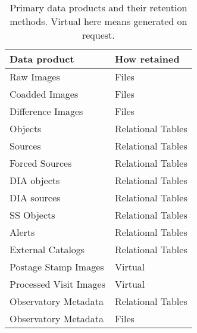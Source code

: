 
\begin{center}
\begin{table}
\caption{Primary data products and their retention methods. Virtual here means generated on request. \label{tab:prods}}
\begin{tabular}{|l|l|}\hline
{\bf Data product}&{\bf  How retained}\\\hline
Raw Images  & Files \\\hline
Coadded Images & Files \\\hline
Difference Images  & Files \\\hline
Objects & Relational Tables \\\hline
Sources  & Relational Tables \\\hline
Forced Sources & Relational Tables \\\hline
DIA objects & Relational Tables \\\hline
DIA sources  & Relational Tables \\\hline
SS Objects  & Relational Tables \\\hline
Alerts & Relational Tables \\\hline
External Catalogs & Relational Tables \\\hline
Postage Stamp Images & Virtual \\\hline
Processed Visit Images & Virtual \\\hline
Observatory Metadata  & Relational Tables \\\hline
Observatory Metadata & Files \\\hline
      \end{tabular}
\end{table}
\end{center}
